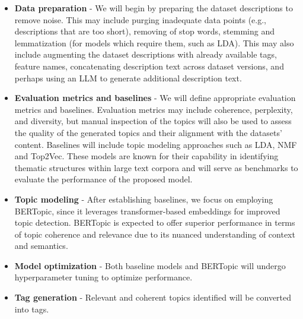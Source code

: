 \documentclass{article}
\begin{document}
\begin{itemize}
    \item \textbf{Data preparation} - We will begin by preparing the dataset descriptions to remove noise. This may include purging inadequate data points (e.g., descriptions that are too short), removing of stop words, stemming and lemmatization (for models which require them, such as LDA). This may also include augmenting the dataset descriptions with already available tags, feature names, concatenating description text across dataset versions, and perhaps using an LLM to generate additional description text.

    \item \textbf{Evaluation metrics and baselines} - We will define appropriate evaluation metrics and baselines. Evaluation metrics may include coherence, perplexity, and diversity, but manual inspection of the topics will also be used to assess the quality of the generated topics and their alignment with the datasets' content. Baselines will include topic modeling approaches such as LDA, NMF and Top2Vec. These models are known for their capability in identifying thematic structures within large text corpora and will serve as benchmarks to evaluate the performance of the proposed model.

    \item \textbf{Topic modeling} - After establishing baselines, we focus on employing BERTopic, since it leverages transformer-based embeddings for improved topic detection. BERTopic is expected to offer superior performance in terms of topic coherence and relevance due to its nuanced understanding of context and semantics.

    \item \textbf{Model optimization} - Both baseline models and BERTopic will undergo hyperparameter tuning to optimize performance.

    \item \textbf{Tag generation} - Relevant and coherent topics identified will be converted into tags.
\end{itemize}
\end{document}
